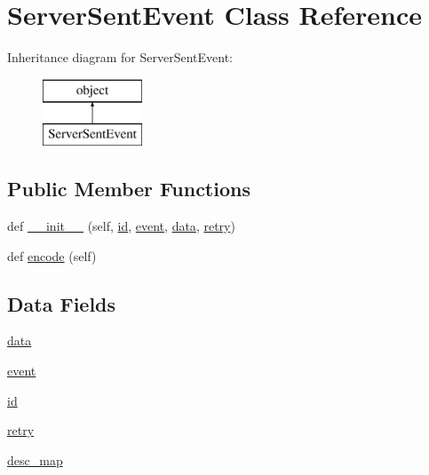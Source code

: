 \hypertarget{classweb_back_1_1_server_sent_event}{}\section{Server\+Sent\+Event Class Reference}
\label{classweb_back_1_1_server_sent_event}
Inheritance diagram for Server\+Sent\+Event\+:\begin{figure}[H]
\begin{center}
\leavevmode
\includegraphics[height=2.000000cm]{classweb_back_1_1_server_sent_event}
\end{center}
\end{figure}
\subsection*{Public Member Functions}
\begin{DoxyCompactItemize}
\item 
def \hyperlink{classweb_back_1_1_server_sent_event_a66ce128aaaf6596bbc7b0e6f3168de3f}{\+\_\+\+\_\+init\+\_\+\+\_\+} (self, \hyperlink{classweb_back_1_1_server_sent_event_acf2488b95c97e0378c9bf49de3b50f28}{id}, \hyperlink{classweb_back_1_1_server_sent_event_a3b65133bb9997cd1ccf311af0927fc9e}{event}, \hyperlink{classweb_back_1_1_server_sent_event_a511ae0b1c13f95e5f08f1a0dd3da3d93}{data}, \hyperlink{classweb_back_1_1_server_sent_event_af6ce9532eff4ab447fa4598622e1c4f2}{retry})
\item 
def \hyperlink{classweb_back_1_1_server_sent_event_a4b60b01b4d79989f97d040a26388d852}{encode} (self)
\end{DoxyCompactItemize}
\subsection*{Data Fields}
\begin{DoxyCompactItemize}
\item 
\hyperlink{classweb_back_1_1_server_sent_event_a511ae0b1c13f95e5f08f1a0dd3da3d93}{data}
\item 
\hyperlink{classweb_back_1_1_server_sent_event_a3b65133bb9997cd1ccf311af0927fc9e}{event}
\item 
\hyperlink{classweb_back_1_1_server_sent_event_acf2488b95c97e0378c9bf49de3b50f28}{id}
\item 
\hyperlink{classweb_back_1_1_server_sent_event_af6ce9532eff4ab447fa4598622e1c4f2}{retry}
\item 
\hyperlink{classweb_back_1_1_server_sent_event_a3f479e287873b8ab2327439f41a36969}{desc\+\_\+map}
\end{DoxyCompactItemize}


